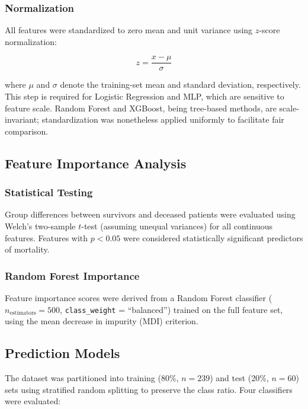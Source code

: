 \documentclass[12pt, a4paper]{article}
\begin{document}
\subsubsection{Normalization}

All features were standardized to zero mean and unit variance using 
$z$-score normalization:

\begin{equation}
    z = \frac{x - \mu}{\sigma}
    \label{eq:zscore}
\end{equation}

where $\mu$ and $\sigma$ denote the training-set mean and standard deviation, 
respectively. This step is required for Logistic Regression and MLP, which 
are sensitive to feature scale. Random Forest and XGBoost, being tree-based 
methods, are scale-invariant; standardization was nonetheless applied 
uniformly to facilitate fair comparison.

\subsection{Feature Importance Analysis}

\subsubsection{Statistical Testing}

Group differences between survivors and deceased patients were evaluated 
using Welch's two-sample $t$-test (assuming unequal variances) for all 
continuous features. Features with $p < 0.05$ were considered statistically 
significant predictors of mortality.

\subsubsection{Random Forest Importance}

Feature importance scores were derived from a Random Forest classifier 
($n_\text{estimators} = 500$, \texttt{class\_weight} = ``balanced'') trained 
on the full feature set, using the mean decrease in impurity (MDI) criterion.

\subsection{Prediction Models}

The dataset was partitioned into training (80\%, $n=239$) and test 
(20\%, $n=60$) sets using stratified random splitting to preserve the 
class ratio. Four classifiers were evaluated:
\end{document}
